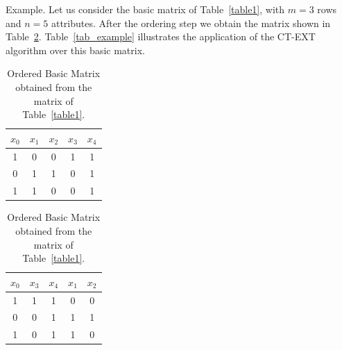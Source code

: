 \documentclass[authoryear,preprint,review,12pt]{elsarticle}
\begin{document}
Example. Let us consider the basic matrix of Table~\ref{table1}, with $m=3$ rows and $n=5$ attributes. After the  ordering step we obtain the matrix shown in Table~\ref{table2}. Table~\ref{tab_example} illustrates the 
application of the CT-EXT algorithm over this basic matrix.

\begin{table}[!htb]
    \begin{minipage}{.5\linewidth}
      \caption{Basic Matrix for the example.}\label{table1}
      \centering
        \begin{tabular}{ ccccc }
 			\hline                       
  			$x_0$ & $x_1$ & $x_2$ & $x_3$ & $x_4$ \\
  			\hline
  			1 & 0 & 0 & 1 & 1 \\
  			0 & 1 & 1 & 0 & 1 \\
  			1 & 1 & 0 & 0 & 1 \\
  			\hline  
		\end{tabular}
    \end{minipage}%
    \begin{minipage}{.5\linewidth}
      \centering
        \caption{Ordered Basic Matrix obtained from the matrix of Table~\ref{table1}.}\label{table2}
        \begin{tabular}{ ccccc }
 			\hline                       
  			$x_0$ & $x_3$ & $x_4$ & $x_1$ & $x_2$ \\
  			\hline
  			1 & 1 & 1 & 0 & 0 \\
  			0 & 0 & 1 & 1 & 1 \\
  			1 & 0 & 1 & 1 & 0 \\
  			\hline  
		\end{tabular}
    \end{minipage} 
\end{table}

\newcommand{\lcell}[2][2in]{$\vcenter{\hsize#1\baselineskip11pt\vspace*{2.5pt}\raggedright#2\strut}$}
\end{document}
